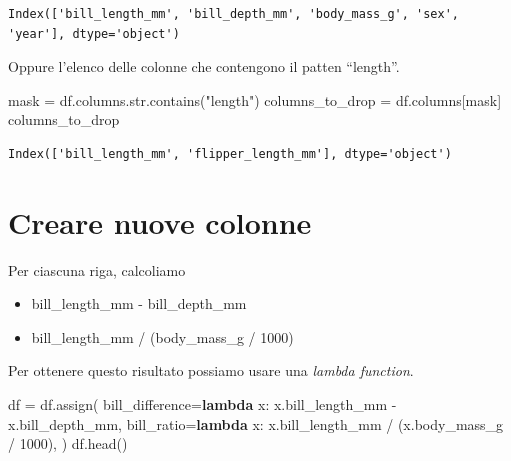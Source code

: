 \documentclass[
  letterpaper,
  krantz2]{{[}./krantz{]}}
\newenvironment{Shaded}{\begin{snugshade}}{\end{snugshade}}
\newcommand{\BuiltInTok}[1]{\textcolor[rgb]{0.00,0.23,0.31}{#1}}
\newcommand{\DecValTok}[1]{\textcolor[rgb]{0.68,0.00,0.00}{#1}}
\newcommand{\KeywordTok}[1]{\textcolor[rgb]{0.00,0.23,0.31}{\textbf{#1}}}
\newcommand{\NormalTok}[1]{\textcolor[rgb]{0.00,0.23,0.31}{#1}}
\newcommand{\OperatorTok}[1]{\textcolor[rgb]{0.37,0.37,0.37}{#1}}
\newcommand{\StringTok}[1]{\textcolor[rgb]{0.13,0.47,0.30}{#1}}
\providecommand{\tightlist}{%
  \setlength{\itemsep}{0pt}\setlength{\parskip}{0pt}}\usepackage{longtable,booktabs,array}
\begin{document}
\begin{verbatim}
Index(['bill_length_mm', 'bill_depth_mm', 'body_mass_g', 'sex', 'year'], dtype='object')
\end{verbatim}

Oppure l'elenco delle colonne che contengono il patten ``length''.

\begin{Shaded}
\begin{Highlighting}[]
\NormalTok{mask }\OperatorTok{=}\NormalTok{ df.columns.}\BuiltInTok{str}\NormalTok{.contains(}\StringTok{"length"}\NormalTok{)}
\NormalTok{columns\_to\_drop }\OperatorTok{=}\NormalTok{ df.columns[mask]}
\NormalTok{columns\_to\_drop}
\end{Highlighting}
\end{Shaded}

\begin{verbatim}
Index(['bill_length_mm', 'flipper_length_mm'], dtype='object')
\end{verbatim}

\section{Creare nuove colonne}\label{creare-nuove-colonne}

Per ciascuna riga, calcoliamo

\begin{itemize}
\tightlist
\item
  bill\_length\_mm - bill\_depth\_mm
\item
  bill\_length\_mm / (body\_mass\_g / 1000)
\end{itemize}

Per ottenere questo risultato possiamo usare una \emph{lambda function}.

\begin{Shaded}
\begin{Highlighting}[]
\NormalTok{df }\OperatorTok{=}\NormalTok{ df.assign(}
\NormalTok{    bill\_difference}\OperatorTok{=}\KeywordTok{lambda}\NormalTok{ x: x.bill\_length\_mm }\OperatorTok{{-}}\NormalTok{ x.bill\_depth\_mm,}
\NormalTok{    bill\_ratio}\OperatorTok{=}\KeywordTok{lambda}\NormalTok{ x: x.bill\_length\_mm }\OperatorTok{/}\NormalTok{ (x.body\_mass\_g }\OperatorTok{/} \DecValTok{1000}\NormalTok{),}
\NormalTok{)}
\NormalTok{df.head()}
\end{Highlighting}
\end{Shaded}
\end{document}

